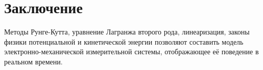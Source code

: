 \documentclass[a4paper,14pt]{extarticle}
\begin{document}
\section{Заключение}
Методы Рунге-Кутта, уравнение Лагранжа второго рода, линеаризация, законы физики потенциальной и кинетической энергии
позволяют составить модель электронно-механической измерительной системы, отображающее её поведение в реальном времени.
\end{document}
